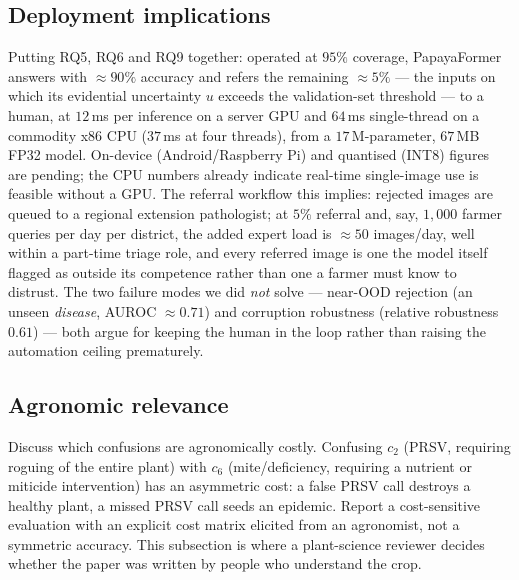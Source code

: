 \documentclass[10pt,twocolumn,a4paper]{article}
\begin{document}
\subsection{Deployment implications}
Putting RQ5, RQ6 and RQ9 together: operated at $95\%$ coverage, PapayaFormer answers with $\approx90\%$ accuracy and refers the remaining $\approx5\%$ --- the inputs on which its evidential uncertainty $u$ exceeds the validation-set threshold --- to a human, at $12$\,ms per inference on a server GPU and $64$\,ms single-thread on a commodity x86 CPU ($37$\,ms at four threads), from a $17$\,M-parameter, $67$\,MB FP32 model. On-device (Android/Raspberry Pi) and quantised (INT8) figures are pending; the CPU numbers already indicate real-time single-image use is feasible without a GPU. The referral workflow this implies: rejected images are queued to a regional extension pathologist; at $5\%$ referral and, say, $1{,}000$ farmer queries per day per district, the added expert load is $\approx50$ images/day, well within a part-time triage role, and every referred image is one the model itself flagged as outside its competence rather than one a farmer must know to distrust. The two failure modes we did \emph{not} solve --- near-OOD rejection (an unseen \emph{disease}, AUROC $\approx0.71$) and corruption robustness (relative robustness $0.61$) --- both argue for keeping the human in the loop rather than raising the automation ceiling prematurely.

\subsection{Agronomic relevance}
Discuss which confusions are agronomically costly. Confusing $c_2$ (PRSV, requiring roguing of the entire plant) with $c_6$ (mite/deficiency, requiring a nutrient or miticide intervention) has an asymmetric cost: a false PRSV call destroys a healthy plant, a missed PRSV call seeds an epidemic. Report a cost-sensitive evaluation with an explicit cost matrix elicited from an agronomist, not a symmetric accuracy. This subsection is where a plant-science reviewer decides whether the paper was written by people who understand the crop.
\end{document}
